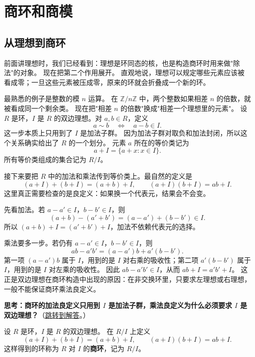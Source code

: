\section{商环和商模}\label{sec:quotient-rings-and-modules}

\subsection{从理想到商环}\label{sec:quotient-ring-construction}

前面讲理想时，我们已经看到：理想是环同态的核，也是构造商环时用来做"除法"的对象。
现在把第二个作用展开。
直观地说，理想可以规定哪些元素应该被看成零；一旦这些元素被压成零，原来的环就会折叠成一个新的环。

最熟悉的例子是整数的模 $n$ 运算。
在 $\mathbb Z/n\mathbb Z$ 中，两个整数如果相差 $n$ 的倍数，就被看成同一个剩余类。
现在把"相差 $n$ 的倍数"换成"相差一个理想里的元素"。
设 $R$ 是环，$I$ 是 $R$ 的双边理想。对 $a,b\in R$，定义
\[
a\sim b \quad\Longleftrightarrow\quad a-b\in I.
\]
这一步本质上只用到了 $I$ 是加法子群。
因为加法子群对取负和加法封闭，所以这个关系确实给出了 $R$ 的一个划分。
元素 $a$ 所在的等价类记为
\[
a+I=\{a+x:x\in I\}.
\]
所有等价类组成的集合记为 $R/I$。

接下来要把 $R$ 中的加法和乘法传到等价类上。最自然的定义是
\[
(a+I)+(b+I)=(a+b)+I,
\qquad
(a+I)(b+I)=ab+I.
\]
这里真正需要检查的是良定义：如果换一个代表元，结果会不会变。

先看加法。若 $a-a'\in I$，$b-b'\in I$，则
\[
(a+b)-(a'+b')=(a-a')+(b-b')\in I.
\]
所以 $(a+b)+I=(a'+b')+I$，加法不依赖代表元的选择。

乘法要多一步。若仍有 $a-a'\in I$，$b-b'\in I$，则
\[
ab-a'b'=(a-a')b+a'(b-b').
\]
第一项 $(a-a')b$ 属于 $I$，用到的是 $I$ 对右乘的吸收性；第二项 $a'(b-b')$ 属于 $I$，用到的是 $I$ 对左乘的吸收性。
因此 $ab-a'b'\in I$，从而 $ab+I=a'b'+I$。
这正是双边理想在商环构造中出现的原因：在非交换环里，只要求左理想或右理想，一般不能保证商环乘法良定义。

\hypertarget{q:quotient-ring-two-sided}{}
\medskip
\noindent\textbf{思考：商环的加法良定义只用到 $I$ 是加法子群，乘法良定义为什么必须要求 $I$ 是双边理想？}（\hyperlink{ans:quotient-ring-two-sided}{跳转到解答}。）
\medskip

\begin{definition}[商环]\label{def:quotient-ring}
设 $R$ 是环，$I$ 是 $R$ 的双边理想。
在 $R/I$ 上定义
\[
(a+I)+(b+I)=(a+b)+I,\qquad (a+I)(b+I)=ab+I.
\]
这样得到的环称为 $R$ 对 $I$ 的\textbf{商环}，记为 $R/I$。
\end{definition}

